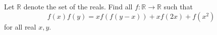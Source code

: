Let $\mathbb{R}$ denote the set of the reals. Find all $f : \mathbb{R} \to \mathbb{R}$ such that$$ f(x)f(y) = xf(f(y-x)) + xf(2x) + f(x^2) $$for all real $x, y$.